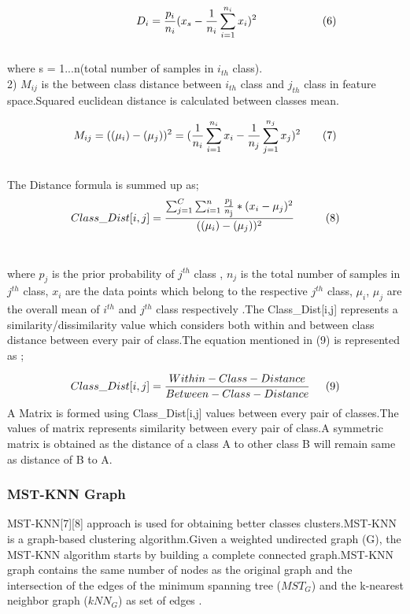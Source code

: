 \documentclass[a4paper, 10pt, conference]{ieeeconf}      %
\begin{document}
\[\hspace{2cm}D_{i} = \frac{p_{i}}{n_{i}}(x_{s}-\frac{1}{n_{i}}\sum_{i=1}^{n_{i}}x_{i})^{2}\hspace{2.1cm}(6)\]\\  
where s = 1...n(total number of samples in $i_{th}$ class).
\newline
\\
2) $M_{ij}$ is the between class distance between $i_{th}$ class and $j_{th}$ class in feature space.Squared euclidean distance is calculated between classes mean.
\par
\[M_{ij} = ((\mu_{i})-(\mu_{j}))^{2} = (\frac{1}{n_{i}}\sum_{i=1}^{n_{i}}x_{i} - \frac{1}{n_{j}}\sum_{j=1}^{n_{j}}x_{j})^{2}\hspace{0.7cm}(7)\] \\
The Distance formula is summed up as;
\[Class\_Dist[i,j] = \frac{\sum_{j=1}^{C}\sum_{i=1}^{n}\frac{p\textsubscript{j}}{n\textsubscript{j}}*(x_{i}-\mu_{j})\textsuperscript{2}}{((\mu_{i})-(\mu_{j}))^{2}}\hspace{1cm}(8) \] \\  
\par 
where $p_{j}$ is the prior probability of $j^{th}$ class , $n_{j}$ is the total number of samples in $j^{th}$ class, $x_{i}$ are the data points which belong to the respective $j^{th}$ class, $\mu_{i}$,  $\mu_{j}$ are the overall mean of $i^{th}$ and $j^{th}$ class respectively .The Class\_Dist[i,j] represents a similarity/dissimilarity value which considers both within and between class distance between every pair of class.The equation mentioned in (9) is represented as ;

\[Class\_Dist[i,j]=\frac{Within-Class-Distance}{Between-Class-Distance}\hspace{0.5cm}(9)\] 
A Matrix is formed using Class\_Dist[i,j] values between every pair of classes.The values of matrix represents similarity between every pair of class.A symmetric matrix is obtained as the distance of a class A to other class B will remain same as distance of B to A.

\subsubsection{MST-KNN Graph} 
MST-KNN[7][8] approach is used for obtaining better classes clusters.MST-KNN is a graph-based clustering algorithm.Given a weighted undirected graph (G), the MST-KNN algorithm starts by building a complete connected graph.MST-KNN graph contains the same number of nodes as the original graph and the intersection of the edges of the minimum spanning tree ($MST_{G}$) and the k-nearest neighbor graph ($kNN_{G}$) as set of edges .
\end{document}
